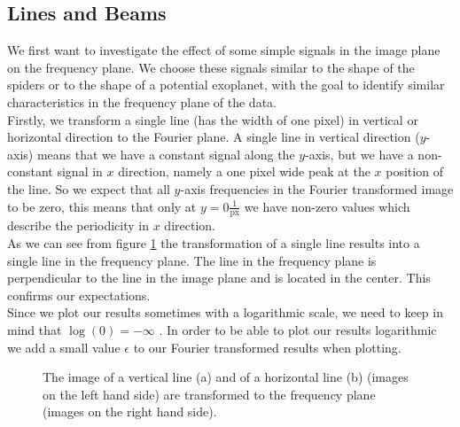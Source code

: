 \subsection{Lines and Beams}
\label{FFT_Lines_Beams}
We first want to investigate the effect of some simple signals in the image plane on the frequency plane. We choose these signals similar to the shape of the spiders or to the shape of a potential exoplanet, with the goal to identify similar characteristics in the frequency plane of the data.\\
Firstly, we transform a single line (has the width of one pixel) in vertical or horizontal direction to the Fourier plane. A single line in vertical direction ($y$-axis) means that we have a constant signal along the $y$-axis, but we have a non-constant signal in $x$ direction, namely a one pixel wide peak at the $x$ position of the line. So we expect that all $y$-axis frequencies in the Fourier transformed image to be zero, this means that only at $y=0 \frac{1}{\mathrm{px}}$ we have non-zero values which describe the periodicity in $x$ direction.\\
As we can see from figure \ref{fig:fft_line} the transformation of a single line results into a single line in the frequency plane. The line in the frequency plane is perpendicular to the line in the image plane and is located in the center. This confirms our expectations.\\
Since we plot our results sometimes with a logarithmic scale, we need to keep in mind that $\log(0) = -\infty$ . In order to be able to plot our results logarithmic we add a small value $\epsilon$ to our Fourier transformed results when plotting.
\begin{figure}[H]
	\centering
\caption{The image of a vertical line (a) and of a horizontal line (b) (images on the left hand side) are transformed to the frequency plane (images on the right hand side).}
\label{fig:fft_line}
\end{figure}
